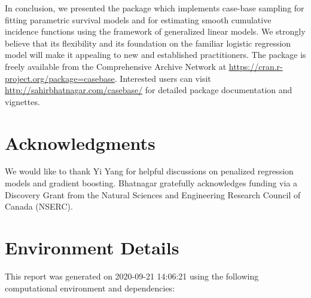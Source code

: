 \documentclass[
]{jss}
\begin{document}
In conclusion, we presented the  package 
which implements case-base sampling for fitting parametric survival
models and for estimating smooth cumulative incidence functions using
the framework of generalized linear models. We strongly believe that its
flexibility and its foundation on the familiar logistic regression model
will make it appealing to new and established practitioners. The
 package is freely available from the Comprehensive
 Archive Network at
\url{https://cran.r-project.org/package=casebase}. Interested users can
visit \url{http://sahirbhatnagar.com/casebase/} for detailed package
documentation and vignettes.

\hypertarget{acknowledgments}{%
\section*{Acknowledgments}\label{acknowledgments}}

We would like to thank Yi Yang for helpful discussions on penalized
regression models and gradient boosting. \mbox{Bhatnagar} gratefully
acknowledges funding via a Discovery Grant from the Natural Sciences and
Engineering Research Council of Canada (NSERC).

\hypertarget{environment-details}{%
\section*{Environment Details}\label{environment-details}}

This report was generated on 2020-09-21 14:06:21 using the following
computational environment and dependencies:
\end{document}
